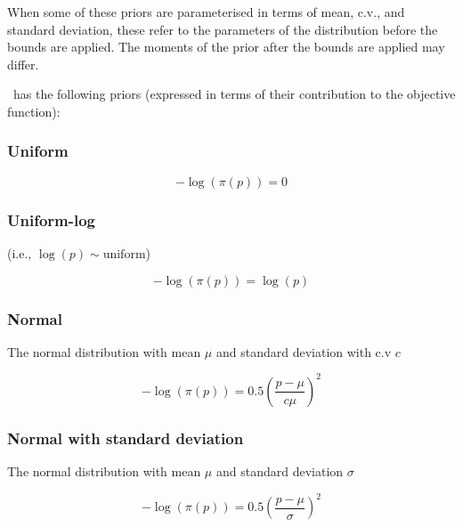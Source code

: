 When some of these priors are parameterised in terms of mean, c.v., and standard deviation, these refer to the parameters of the distribution before the bounds are applied. The moments of the prior after the bounds are applied may differ.

\CNAME\ has the following priors (expressed in terms of their contribution to the objective function):

\subsubsection{Uniform}\label{sec:Prior-Uniform}

\begin{equation}
 - \log \left(\pi \left(p \right) \right) = 0
\end{equation}

\subsubsection{Uniform-log} (i.e., $\log(p) \sim \text{uniform}$)\label{sec:Prior-UniformLog}

\begin{equation}
 - \log \left(\pi \left(p \right) \right) = \log \left( p \right)
\end{equation}

\subsubsection{Normal}\label{sec:Prior-Normal}

The normal distribution with mean $\mu$ and standard deviation with c.v $c$

\begin{equation}
 - \log \left(\pi \left(p \right) \right) = 0.5\left(\frac{p - \mu}{c\mu} \right)^2
\end{equation}

\subsubsection{Normal with standard deviation}\label{sec:Prior-NormalByStdev}

The normal distribution with mean $\mu$ and standard deviation $\sigma$

\begin{equation}
 - \log \left(\pi \left(p \right) \right) = 0.5\left(\frac{p - \mu}
{\sigma }\right)^2
\end{equation}

